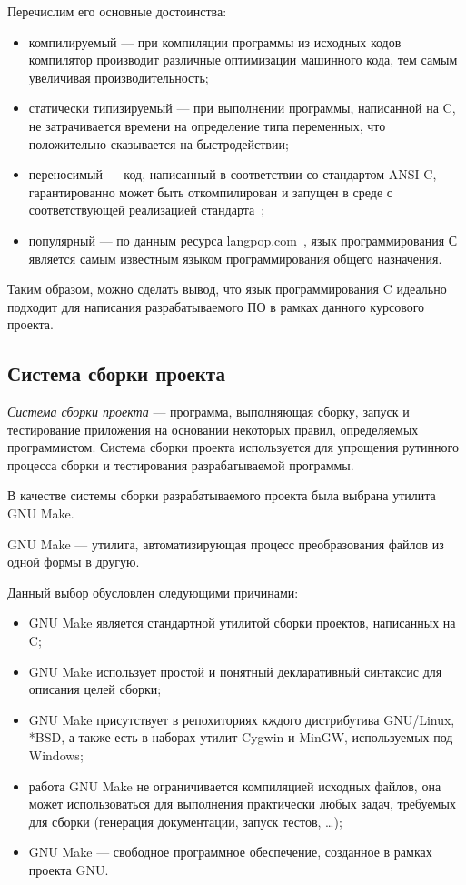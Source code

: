 Перечислим его основные достоинства:
\begin{itemize}
\item компилируемый --- при компиляции программы из исходных кодов
  компилятор производит различные оптимизации машинного кода, 
  тем самым увеличивая производительность;
\item статически типизируемый --- при выполнении программы, написанной на C,
  не затрачивается времени на определение типа переменных,
  что положительно сказывается на быстродействии;
\item переносимый --- код, написанный в соответствии со стандартом ANSI C,
  гарантированно может быть откомпилирован и запущен в среде с 
  соответствующей реализацией стандарта~\cite{ansi_c};
\item популярный --- по данным ресурса langpop.com~\cite{langs_popularity},
  язык программирования С является самым известным языком программирования 
  общего назначения.
\end{itemize}

Таким образом, можно сделать вывод, что язык программирования C идеально 
подходит для написания разрабатываемого ПО в рамках данного курсового проекта. 

\subsection{Система сборки проекта}
\label{ssec:choice_build_system}

\textit{Система сборки проекта} --- программа, выполняющая сборку, 
запуск и тестирование приложения на основании некоторых правил,
определяемых программистом. 
Система сборки проекта используется для упрощения рутинного процесса сборки 
и тестирования разрабатываемой программы.

В качестве системы сборки разрабатываемого проекта была выбрана утилита GNU Make.

GNU Make --- утилита, автоматизирующая процесс преобразования файлов
из одной формы в другую.

Данный выбор обусловлен следующими причинами:
\begin{itemize}
\item GNU Make является стандартной утилитой сборки проектов,
  написанных на C;
\item GNU Make использует простой и понятный декларативный синтаксис для
  описания целей сборки;
\item GNU Make присутствует в репохиториях кждого дистрибутива GNU/Linux, *BSD,
  а также есть в наборах утилит Cygwin и MinGW, используемых под Windows;
\item работа GNU Make не ограничивается компиляцией исходных файлов,
  она может использоваться для выполнения практически любых задач,
  требуемых для сборки (генерация документации, запуск тестов, \dots);
\item GNU Make --- свободное программное обеспечение,
  созданное в рамках проекта GNU.
\end{itemize}

